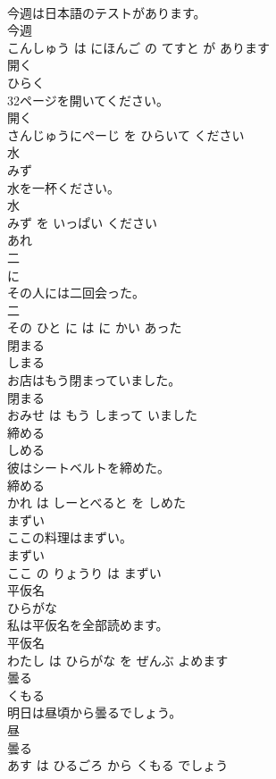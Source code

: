 \documentclass[8pt]{extreport}
\begin{document}
\begin{CJK}{UTF8}{min}
\\	今週は日本語のテストがあります。	
\\	今週 
\\	こんしゅう は にほんご の てすと が あります			
\\	開く	
\\	ひらく			
\\	32ページを開いてください。	
\\	開く 
\\	さんじゅうにぺーじ を ひらいて ください			
\\	水	
\\	みず			
\\	水を一杯ください。	
\\	水 
\\	みず を いっぱい ください			
\\	あれ	
\\	二	
\\	に			
\\	その人には二回会った。	
\\	二 
\\	その ひと に は に かい あった			
\\	閉まる	
\\	しまる			
\\	お店はもう閉まっていました。	
\\	閉まる 
\\	おみせ は もう しまって いました			
\\	締める	
\\	しめる			
\\	彼はシートベルトを締めた。	
\\	締める 
\\	かれ は しーとべると を しめた			
\\	まずい	
\\	ここの料理はまずい。	
\\	まずい 
\\	ここ の りょうり は まずい			
\\	平仮名	
\\	ひらがな			
\\	私は平仮名を全部読めます。	
\\	平仮名 
\\	わたし は ひらがな を ぜんぶ よめます			
\\	曇る	
\\	くもる			
\\	明日は昼頃から曇るでしょう。	
\\	昼 
\\	曇る 
\\	あす は ひるごろ から くもる でしょう			

\end{CJK}
\end{document}
